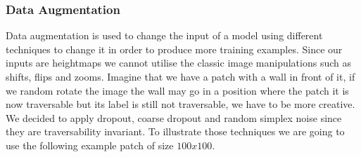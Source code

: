 \documentclass[../document.tex]{subfiles}
\begin{document}
\subsubsection{Data Augmentation}
Data augmentation is used to change the input of a model using different techniques to change it in order to produce more training examples. Since our inputs are heightmaps we cannot utilise the classic image manipulations such as shifts, flips and zooms. Imagine that we have a patch with a wall in front of it, if we random rotate the image the wall may go in a position where the patch it is now traversable but its label is still not traversable, we have to be more creative. We decided to apply dropout, coarse dropout and random simplex noise since they are traversability invariant. To illustrate those techniques we are going to use the following example patch of size $100x100$.
\end{document}
